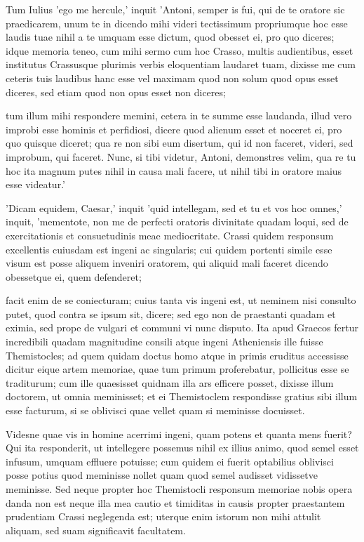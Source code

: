  Tum Iulius 'ego me hercule,' inquit 'Antoni, semper is fui, qui de te oratore sic praedicarem, unum te in dicendo mihi videri tectissimum propriumque hoc esse laudis tuae nihil a te umquam esse dictum, quod obesset ei, pro quo diceres; idque memoria teneo, cum mihi sermo cum hoc Crasso, multis audientibus, esset institutus Crassusque plurimis verbis eloquentiam laudaret tuam, dixisse me cum ceteris tuis laudibus hanc esse vel maximam quod non solum quod opus esset diceres, sed etiam quod non opus esset non diceres;

 tum illum mihi respondere memini, cetera in te summe esse laudanda, illud vero improbi esse hominis et perfidiosi, dicere quod alienum esset et noceret ei, pro quo quisque diceret; qua re non sibi eum disertum, qui id non faceret, videri, sed improbum, qui faceret. Nunc, si tibi videtur, Antoni, demonstres velim, qua re tu hoc ita magnum putes nihil in causa mali facere, ut nihil tibi in oratore maius esse videatur.'

 'Dicam equidem, Caesar,' inquit 'quid intellegam, sed et tu et vos hoc omnes,' inquit, 'mementote, non me de perfecti oratoris divinitate quadam loqui, sed de exercitationis et consuetudinis meae mediocritate. Crassi quidem responsum excellentis cuiusdam est ingeni ac singularis; cui quidem portenti simile esse visum est posse aliquem inveniri oratorem, qui aliquid mali faceret dicendo obessetque ei, quem defenderet;

 facit enim de se coniecturam; cuius tanta vis ingeni est, ut neminem nisi consulto putet, quod contra se ipsum sit, dicere; sed ego non de praestanti quadam et eximia, sed prope de vulgari et communi vi nunc disputo. Ita apud Graecos fertur incredibili quadam magnitudine consili atque ingeni Atheniensis ille fuisse Themistocles; ad quem quidam doctus homo atque in primis eruditus accessisse dicitur eique artem memoriae, quae tum primum proferebatur, pollicitus esse se traditurum; cum ille quaesisset quidnam illa ars efficere posset, dixisse illum doctorem, ut omnia meminisset; et ei Themistoclem respondisse gratius sibi illum esse facturum, si se oblivisci quae vellet quam si meminisse docuisset.

 Videsne quae vis in homine acerrimi ingeni, quam potens et quanta mens fuerit? Qui ita responderit, ut intellegere possemus nihil ex illius animo, quod semel esset infusum, umquam effluere potuisse; cum quidem ei fuerit optabilius oblivisci posse potius quod meminisse nollet quam quod semel audisset vidissetve meminisse. Sed neque propter hoc Themistocli responsum memoriae nobis opera danda non est neque illa mea cautio et timiditas in causis propter praestantem prudentiam Crassi neglegenda est; uterque enim istorum non mihi attulit aliquam, sed suam significavit facultatem.

